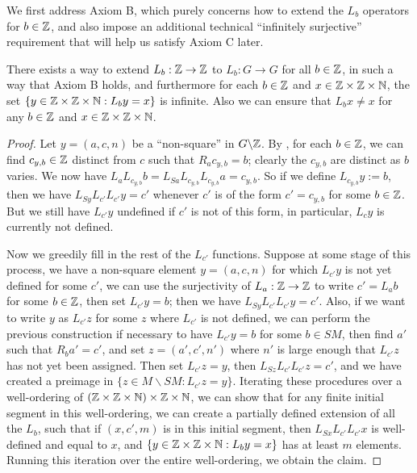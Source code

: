 We first address Axiom B, which purely concerns how to extend the $L_b$ operators for $b \in \mathbb{Z}$, and also impose an additional technical ``infinitely surjective'' requirement that will help us satisfy Axiom C later.

\begin{proposition}\label{axiom-b}  There exists a way to extend $L_b: \mathbb{Z} \to \mathbb{Z}$ to $L_b: G \to G$ for all $b \in \mathbb{Z}$, in such a way that Axiom B holds, and furthermore for each $b \in \mathbb{Z}$ and $x \in \mathbb{Z} \times \mathbb{Z} \times \mathbb{N}$, the set $\{ y \in \mathbb{Z} \times \mathbb{Z} \times \mathbb{N}: L_b y = x \}$ is infinite. Also we can ensure that $L_b x \neq x$ for any $b \in \mathbb{Z}$ and $x \in \mathbb{Z} \times \mathbb{Z} \times \mathbb{N}$.
\end{proposition}

\begin{proof}  Let $y = (a,c,n)$ be a ``non-square'' in $G \backslash \mathbb{Z}$.  By , for each $b \in \mathbb{Z}$, we can find
$c_{y,b} \in \mathbb{Z}$ distinct from $c$ such that $R_a c_{y,b} = b$; clearly the $c_{y,b}$ are distinct as $b$ varies.  We now have $ L_a L_{c_{y,b}} b = L_{Sa} L_{c_{y,b}} L_{c_{y,b}} a = c_{y,b}$.  So if we define $L_{c_{y,b}} y := b$, then we have $L_{Sy} L_{c'} L_{c'} y = c'$ whenever $c'$ is of the form $c' = c_{y,b}$ for some $b \in \mathbb{Z}$.  But we still have $L_{c'} y$ undefined if $c'$ is not of this form, in particular, $L_c y$ is currently not defined.

Now we greedily fill in the rest of the $L_{c'}$ functions.  Suppose at some stage of this process, we have a non-square element $y = (a,c,n)$ for which $L_{c'} y$ is not yet defined for some $c'$, we can use the surjectivity of $L_a: \mathbb{Z} \to \mathbb{Z}$ to write $c' = L_a b$ for some $b \in \mathbb{Z}$, then set $L_{c'} y = b$; then we have $L_{Sy} L_{c'} L_{c'} y = c'$.  Also, if we want to write $y$ as $L_{c'} z$ for some $z$ where $L_{c'}$ is not defined, we can perform the previous construction if necessary to have $L_{c'} y  = b$ for some $b \in SM$, then find $a'$ such that $R_b a' = c'$, and set $z = (a', c', n')$ where $n'$ is large enough that $L_{c'} z$ has not yet been assigned.  Then set $L_{c'} z = y$, then $L_{Sz} L_{c'} L_{c'} z = c'$, and we have created a preimage in $\{ z \in M \backslash SM: L_{c'} z = y\}$.  Iterating these procedures over a well-ordering of $(\mathbb{Z} \times \mathbb{Z} \times \mathbb{N}) \times \mathbb{Z} \times \mathbb{N}$, we can show that for any finite initial segment in this well-ordering, we can create a partially defined extension of all the $L_b$, such that if $(x,c',m)$ is in this initial segment, then $L_{Sx} L_{c'} L_{c'} x$ is well-defined and equal to $x$,  and $\{ y \in \mathbb{Z} \times \mathbb{Z} \times \mathbb{N}: L_b y = x \}$ has at least $m$ elements.  Running this iteration over the entire well-ordering, we obtain the claim.
\end{proof}

